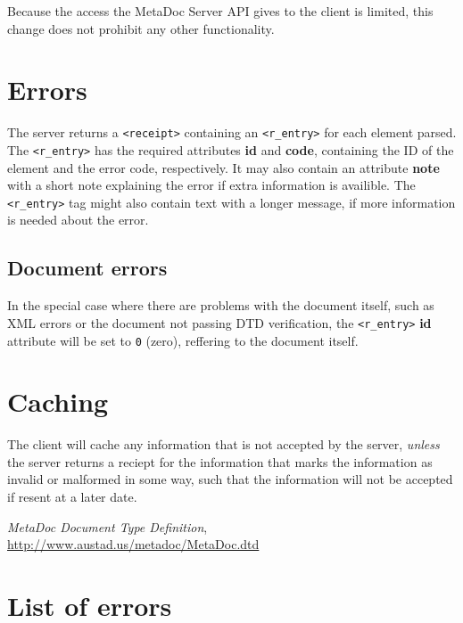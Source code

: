 \documentclass[titlepage, a4paper,10pt]{article}
\begin{document}
Because the access the MetaDoc Server API gives to the client is limited, this change does not prohibit any other functionality. 

\section{Errors}
\label{sec:errors}

The server returns a \texttt{<receipt>} containing an \texttt{<r\_entry>} for each element parsed. The \texttt{<r\_entry>} has the required attributes \textbf{id} and \textbf{code}, containing the ID of the element and the error code, respectively. It may also contain an attribute \textbf{note} with a short note explaining the error if extra information is availible. The \texttt{<r\_entry>} tag might also contain text with a longer message, if more information is needed about the error. 

\subsection{Document errors}

In the special case where there are problems with the document itself, such as XML errors or the document not passing DTD verification, the \texttt{<r\_entry>} \textbf{id} attribute will be set to \texttt{0} (zero), reffering to the document itself. 

\section{Caching}

The client will cache any information that is not accepted by the server, \textit{unless} the server returns a reciept for the information that marks the information as invalid or malformed in some way, such that the information will not be accepted if resent at a later date. 

\newpage
\begin{thebibliography}{99}
     \textit{MetaDoc Document Type Definition}, \url{http://www.austad.us/metadoc/MetaDoc.dtd}
\end{thebibliography}

\newpage
\appendix

\section{List of errors}
\end{document}
